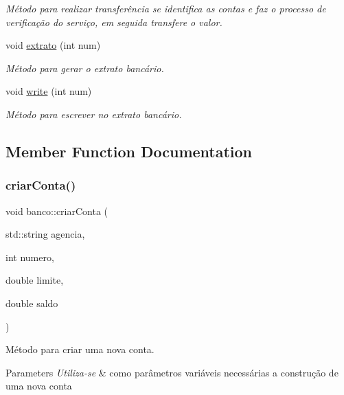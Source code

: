 \begin{DoxyCompactItemize}
\begin{DoxyCompactList}\small\item\em Método para realizar transferência se identifica as contas e faz o processo de verificação do serviço, em seguida transfere o valor. \end{DoxyCompactList}\item 
void \mbox{\hyperlink{classbanco_ab13b225a8005a75a31f2c2938b9869e1}{extrato}} (int num)
\begin{DoxyCompactList}\small\item\em Método para gerar o extrato bancário. \end{DoxyCompactList}\item 
void \mbox{\hyperlink{classbanco_ac2ca2d3e9a02bf099e3b1deb5303c2ce}{write}} (int num)
\begin{DoxyCompactList}\small\item\em Método para escrever no extrato bancário. \end{DoxyCompactList}\end{DoxyCompactItemize}


\subsection{Member Function Documentation}
\mbox{\label{classbanco_af0a23a450d1f0a413196a0e0f20225b9}} 
\subsubsection{\texorpdfstring{criar\+Conta()}{criarConta()}}
{\footnotesize\ttfamily void banco\+::criar\+Conta (\begin{DoxyParamCaption}\item[{std\+::string}]{agencia,  }\item[{int}]{numero,  }\item[{double}]{limite,  }\item[{double}]{saldo }\end{DoxyParamCaption})}



Método para criar uma nova conta. 


\begin{DoxyParams}{Parameters}
{\em Utiliza-\/se} & como parâmetros variáveis necessárias a construção de uma nova conta \\
\hline
\end{DoxyParams}
\mbox{\label{classbanco_a5299f885390fee021a84ffb309a0ca2f}} 
